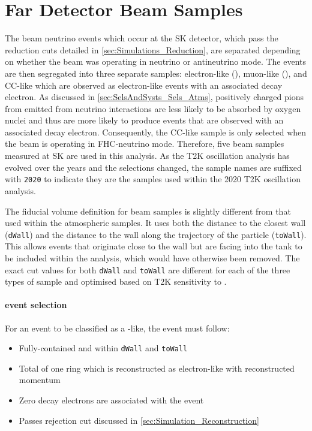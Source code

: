 \section{Far Detector Beam Samples}
\label{sec:SelsAndSysts_Sels_FD}

The beam neutrino events which occur at the SK detector, which pass the reduction cuts detailed in \autoref{sec:Simulations_Reduction}, are separated depending on whether the beam was operating in neutrino or antineutrino mode. The events are then segregated into three separate samples: electron-like (), muon-like (), and CC\quickmath{1\pi^{+}}-like which are observed as electron-like events with an associated decay electron. As discussed in \autoref{sec:SelsAndSysts_Sels_Atms}, positively charged pions from emitted from neutrino interactions are less likely to be absorbed by oxygen nuclei and thus are more likely to produce events that are observed with an associated decay electron. Consequently, the CC\quickmath{1\pi^{+}}-like sample is only selected when the beam is operating in FHC-neutrino mode. Therefore, five beam samples measured at SK are used in this analysis. As the T2K oscillation analysis has evolved over the years and the selections changed, the sample names are suffixed with \texttt{2020} to indicate they are the samples used within the 2020 T2K oscillation analysis.

The fiducial volume definition for beam samples is slightly different from that used within the atmospheric samples.  It uses both the distance to the closest wall (\texttt{dWall}) and the distance to the wall along the trajectory of the particle (\texttt{toWall}). This allows events that originate close to the wall but are facing into the tank to be included within the analysis, which would have otherwise been removed. The exact cut values for both \texttt{dWall} and \texttt{toWall} are different for each of the three types of sample and optimised based on T2K sensitivity to \dcp \cite{t2k_tn_318, t2k_tn_319}.

\paragraph{ event selection}

For an event to be classified as a -like, the event must follow:

\begin{itemize}
\item Fully-contained and within \texttt{dWall}  and \texttt{toWall} 
\item Total of one ring which is reconstructed as electron-like with reconstructed momentum 
\item Zero decay electrons are associated with the event
\item Passes  rejection cut discussed in \autoref{sec:Simulation_Reconstruction}
\end{itemize}

